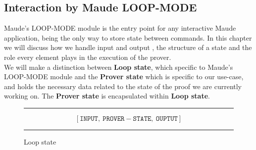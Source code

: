 \documentclass[12pt,a4paper]{article}
\begin{document}
{\subsection{Interaction by Maude LOOP-MODE}
Maude's LOOP-MODE module is the entry point for any interactive Maude application, being the only way to store state between commands. In this chapter we will discuss how we handle input and output , the structure of a state and the role every element plays in the execution of the prover.\\

We will make a distinction between \textbf{Loop state}, which specific to Maude's LOOP-MODE module and the \textbf{Prover state} which is specific to our use-case, and holds the necessary data related to the state of the proof we are currently working on. The \textbf{Prover state} is encapsulated within \textbf{Loop state}.
\begin{figure}[h]
	\noindent\rule{\linewidth}{0.4pt}

	\[
		[\mathtt{INPUT},\ \mathtt{PROVER-STATE},\ \mathtt{OUPTUT}]
	\]
	\label{fig:loopState}
	\caption{Loop state}
	\noindent\rule{\linewidth}{0.4pt}
\end{figure}
}
\end{document}
